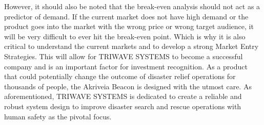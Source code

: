 \bigskip
However, it should also be noted that the break-even analysis should not act as a predictor of demand.
If the current market does not have high demand or the product goes into the market with the wrong price or wrong target audience, it will be very difficult to ever hit the break-even point. Which is why it is also critical to understand the current markets and to develop a strong Market Entry Strategies. This will allow for TRIWAVE SYSTEMS to become a successful company and is an important factor for investment recognition. As a product that could potentially change the outcome of disaster relief operations for thousands of people, the Akriveia Beacon is designed with the utmost care. As aforementioned, TRIWAVE SYSTEMS is dedicated to create a reliable and robust system design to improve disaster search and rescue operations with human safety as the pivotal focus.

